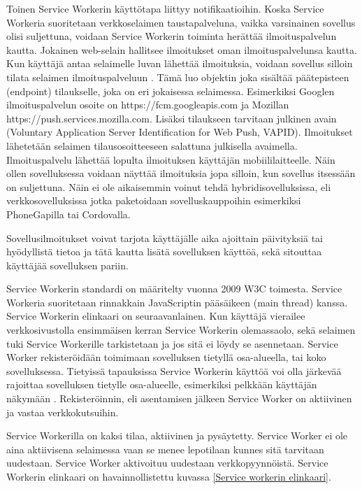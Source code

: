 \documentclass{tktltiki}
\begin{document}
Toinen Service Workerin käyttötapa liittyy notifikaatioihin. Koska Service Workeria suoritetaan verkkoselaimen taustapalveluna, vaikka varsinainen sovellus olisi suljettuna, voidaan Service Workerin toiminta herättää ilmoituspalvelun kautta. Jokainen web-selain hallitsee ilmoitukset oman ilmoituspalvelunsa kautta. Kun käyttäjä antaa selaimelle luvan lähettää ilmoituksia, voidaan sovellus silloin tilata selaimen ilmoituspalveluun \cite{Googleb}. Tämä luo objektin joka sisältää päätepisteen (endpoint) tilaukselle, joka on eri jokaisessa selaimessa. Esimerkiksi Googlen ilmoituspalvelun osoite on https://fcm.googleapis.com ja Mozillan https://push.services.mozilla.com. Lisäksi tilaukseen tarvitaan julkinen avain (Voluntary Application Server Identification for Web Push, VAPID). Ilmoitukset lähetetään selaimen tilausosoitteeseen salattuna julkisella avaimella. Ilmoituspalvelu lähettää lopulta ilmoituksen käyttäjän mobiililaitteelle. Näin ollen sovelluksessa voidaan näyttää ilmoituksia jopa silloin, kun sovellus itsessään on suljettuna. Näin ei ole aikaisemmin voinut tehdä hybridisovelluksissa, eli verkkosovelluksissa jotka paketoidaan sovelluskauppoihin esimerkiksi PhoneGapilla tai Cordovalla.

Sovellusilmoitukset voivat tarjota käyttäjälle aika ajoittain päivityksiä tai hyödyllistä tietoa ja tätä kautta lisätä sovelluksen käyttöä, sekä sitouttaa käyttäjää sovelluksen pariin. \cite{8441701}

Service Workerin standardi on määritelty vuonna 2009 W3C toimesta. Service Workeria suoritetaan rinnakkain JavaScriptin pääsäikeen (main thread) kanssa. Service Workerin elinkaari on seuraavanlainen. Kun käyttäjä vierailee verkkosivustolla ensimmäisen kerran Service Workerin olemassaolo, sekä selaimen tuki Service Workerille tarkistetaan ja jos sitä ei löydy se asennetaan. Service Worker rekisteröidään toimimaan sovelluksen tietyllä osa-alueella, tai koko sovelluksessa. Tietyissä tapauksissa Service Workerin käyttöä voi olla järkevää rajoittaa sovelluksen tietylle osa-alueelle, esimerkiksi pelkkään käyttäjän näkymään \cite{hiltunen2018creating}. Rekisteröinnin, eli asentamisen jälkeen Service Worker on aktiivinen ja vastaa verkkokutsuihin. 

Service Workerilla on kaksi tilaa, aktiivinen ja pysäytetty. Service Worker ei ole aina aktiivisena selaimessa vaan se menee lepotilaan kunnes sitä tarvitaan uudestaan. Service Worker aktivoituu uudestaan verkkopyynnöistä. Service Workerin elinkaari on havainnollistettu kuvassa \ref{Service workerin elinkaari}.
\end{document}
